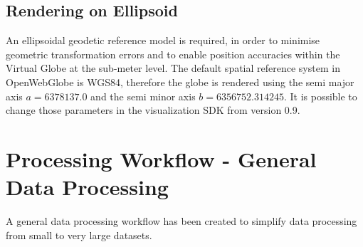 \documentclass[
	12pt,
	a4paper,
	english,	
	appendixprefix,				     			        
	openany,		     	
	abstracton,		    		    
 	BCOR8mm,		    
]{scrartcl}
\begin{document}



\subsection{Rendering on Ellipsoid}

An ellipsoidal geodetic reference model is required, in order to minimise geometric
transformation errors and to enable position accuracies within the Virtual Globe
at the sub-meter level.\cite{Christen2010} The default spatial reference system in OpenWebGlobe is WGS84, therefore the globe is rendered using the semi major axis $a=6378137.0$ and the semi minor axis $b=6356752.314245$. 
It is possible to change those parameters in the visualization SDK from version 0.9.



\section{Processing Workflow - General Data Processing}

A general data processing workflow has been created\cite{Christen2011b} to simplify data processing from small to very large datasets.
\end{document}
